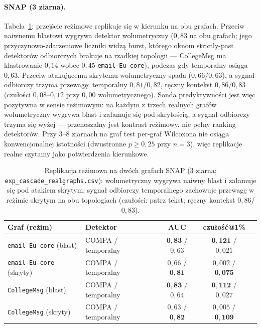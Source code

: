 \paragraph{SNAP (3 ziarna).}
Tabela~\ref{tab:k-snap}: przejście reżimowe replikuje się w kierunku
na obu grafach. Przeciw naiwnemu blastowi wygrywa detektor
wolumetryczny ($0{,}83$ na obu grafach; jego
przyczynowo-zdarzeniowe liczniki widzą burst, którego oknom
strictly-past detektorów odbiorczych brakuje na rzadkiej
topologii --- CollegeMsg ma klastrowanie $0{,}14$ wobec $0{,}45$
\texttt{email-Eu-core}), podczas gdy temporalny osiąga $0{,}63$.
Przeciw atakującemu skrytemu wolumetryczny spada ($0{,}66$/$0{,}63$),
a sygnał odbiorczy trzyma przewagę: temporalny $0{,}81$/$0{,}82$,
ręczny kontekst $0{,}86$/$0{,}83$ (czułości $0{,}08$--$0{,}12$ przy
$0{,}00$ wolumetrycznego). Sonda predyktywności jest więc
pozytywna w sensie reżimowym: na każdym z trzech realnych grafów
wolumetryczny wygrywa blast i załamuje się pod skrytością,
a sygnał odbiorczy trzyma się wyżej --- przenoszalny jest kontrast
reżimowy, nie pełny ranking detektorów. Przy 3--8 ziarnach na graf
test per-graf Wilcoxona nie osiąga konwencjonalnej istotności
(dwustronne $p\ge0{,}25$ przy $n{=}3$), więc replikacje realne
czytamy jako potwierdzenia kierunkowe.

\begin{table}[htbp]\centering\small
\begin{tabular}{llccc}
\toprule
Graf (reżim) & Detektor & AUC & czułość@1\% \\
\midrule
\texttt{email-Eu-core} (blast) & COMPA / temporalny & $\mathbf{0{,}83}$ / $0{,}63$ & $\mathbf{0{,}121}$ / $0{,}021$ \\
\texttt{email-Eu-core} (skryty) & COMPA / temporalny & $0{,}66$ / $\mathbf{0{,}81}$ & $0{,}002$ / $\mathbf{0{,}075}$ \\
\texttt{CollegeMsg} (blast) & COMPA / temporalny & $\mathbf{0{,}83}$ / $0{,}64$ & $\mathbf{0{,}112}$ / $0{,}027$ \\
\texttt{CollegeMsg} (skryty) & COMPA / temporalny & $0{,}63$ / $\mathbf{0{,}82}$ & $0{,}005$ / $\mathbf{0{,}109}$ \\
\bottomrule
\end{tabular}
\caption{Replikacja reżimowa na dwóch grafach SNAP (3 ziarna;
\texttt{exp\_cascade\_realgraphs.csv}): wolumetryczny wygrywa
naiwny blast i załamuje się pod atakiem skrytym; sygnał odbiorczy
temporalnego zachowuje przewagę w reżimie skrytym na obu
topologiach (czułości: patrz tekst; ręczny kontekst $0{,}86$/$0{,}83$).}
\label{tab:k-snap}
\end{table}

